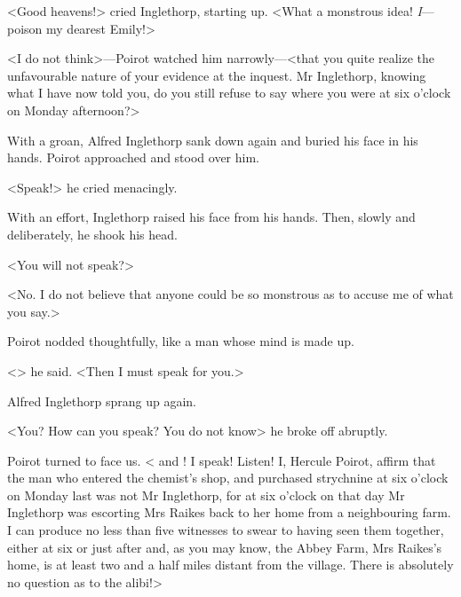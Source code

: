  <Good heavens!> cried Inglethorp, starting up. <What a monstrous idea! \emph{I}—poison my dearest Emily!> 

 <I do not think>—Poirot watched him narrowly—<that you quite realize the unfavourable nature of your evidence at the inquest. Mr Inglethorp, knowing what I have now told you, do you still refuse to say where you were at six o'clock on Monday afternoon?> 

 With a groan, Alfred Inglethorp sank down again and buried his face in his hands. Poirot approached and stood over him. 

 <Speak!> he cried menacingly. 

 With an effort, Inglethorp raised his face from his hands. Then, slowly and deliberately, he shook his head. 

 <You will not speak?> 

 <No. I do not believe that anyone could be so monstrous as to accuse me of what you say.> 

 Poirot nodded thoughtfully, like a man whose mind is made up. 

 <> he said. <Then I must speak for you.> 

 Alfred Inglethorp sprang up again. 

 <You? How can you speak? You do not know\longdash> he broke off abruptly. 

 Poirot turned to face us. < and ! I speak! Listen! I, Hercule Poirot, affirm that the man who entered the chemist's shop, and purchased strychnine at six o'clock on Monday last was not Mr Inglethorp, for at six o'clock on that day Mr Inglethorp was escorting Mrs Raikes back to her home from a neighbouring farm. I can produce no less than five witnesses to swear to having seen them together, either at six or just after and, as you may know, the Abbey Farm, Mrs Raikes's home, is at least two and a half miles distant from the village. There is absolutely no question as to the alibi!> 